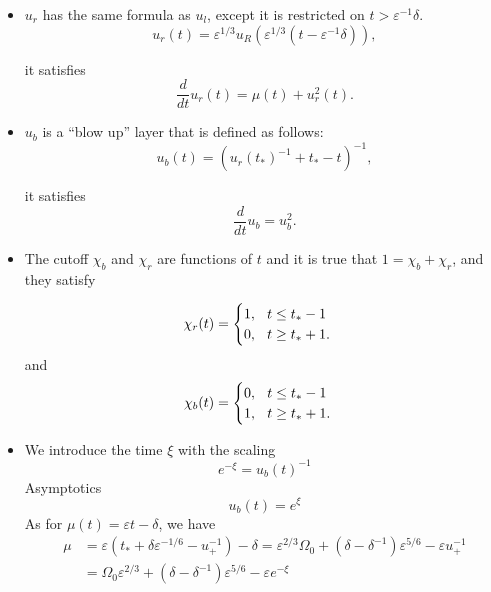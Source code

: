 \documentclass[letterpaper,11pt]{article}
\newcommand{\eps}{\varepsilon}
\numberwithin{equation}{section}
\theoremstyle{plain}
\begin{document}
\begin{itemize}
\item $u_r$ has the same formula as $u_l$, except it is restricted on $t>\eps^{-1}\delta$.
\begin{equation}\label{urdef}
u_r(t) = \eps^{1/3}u_R(\eps^{1/3}(t-\eps^{-1}\delta)),
\end{equation}

it satisfies
\begin{equation}\label{ureq}
\frac{d}{dt}u_r(t) = \mu(t) + u_r^2(t).
\end{equation}

\item $u_b$ is a ``blow up'' layer that is defined as follows:
\begin{equation}\label{ubdef}
u_b(t) = (u_r(t_*)^{-1}+t_* - t)^{-1},
\end{equation}

it satisfies
\begin{equation}\label{ubeq}
\frac{d}{dt} u_b = u_b^2.
\end{equation}

\item The cutoff $\chi_b$ and $\chi_r$ are functions of $t$ and it is true that $1=\chi_b+\chi_r$, and they satisfy

\begin{equation}\label{cutoffIIr}
\chi_r(t) =\begin{cases}
1,  \hspace{0.1in} t \le t_* -1\\
0 , \hspace{0.1in} t \ge t_* +1.
\end{cases}
\end{equation}
and
\begin{equation}\label{cutoffIIb}
\chi_b(t) =\begin{cases}
0,  \hspace{0.1in} t \le t_* -1\\
1 , \hspace{0.1in} t \ge t_* +1.
\end{cases}
\end{equation}

\pagebreak
\item We introduce the time $\xi$ with the scaling
\[
e^{-\xi} = u_b(t)^{-1}
\] Asymptotics \begin{equation*}
u_b(t) =e^\xi
\end{equation*}
As for $\mu(t) = \eps t -\delta$, we have
\begin{align*}
\mu &= \eps(t_*+\delta\eps^{-1/6}-u_+^{-1}) -\delta = \eps^{2/3}\Omega_0 +(\delta-\delta^{-1})\eps^{5/6} -\eps u_+^{-1}\\
&=\Omega_0\eps^{2/3} +(\delta-\delta^{-1})\eps^{5/6}-\eps e^{-\xi}
\end{align*}



\end{itemize}
\end{document}
